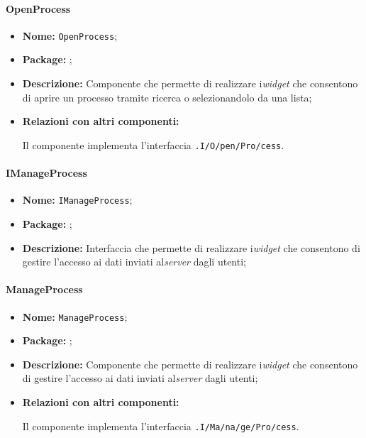 \paragraph{OpenProcess}
\begin{flushleft}
\begin{itemize}
\item \textbf{Nome:} \texttt{OpenProcess};
\item \textbf{Package:} \texttt{\viewAdmin{}};
\item \textbf{Descrizione:} Componente che permette di realizzare i\textit{widget} che consentono di aprire un processo tramite ricerca o selezionandolo da una lista;
\item \textbf{Relazioni con altri componenti:}
\begin{sloppypar}
Il componente implementa l'interfaccia \texttt{\viewAdmin{}.I\fshyp{}O\fshyp{}pen\fshyp{}Pro\fshyp{}cess}.
\end{sloppypar}
\end{itemize}
\end{flushleft}

\paragraph{IManageProcess}
\begin{itemize}
\item \textbf{Nome:} \texttt{IManageProcess};
\item \textbf{Package:} \texttt{\viewAdmin{}};
\item \textbf{Descrizione:} Interfaccia che permette di realizzare i\textit{widget} che consentono di gestire l'accesso ai dati inviati al\textit{server} dagli utenti;
\end{itemize}

\paragraph{ManageProcess}
\begin{flushleft}
\begin{itemize}
\item \textbf{Nome:} \texttt{ManageProcess};
\item \textbf{Package:} \texttt{\viewAdmin{}};
\item \textbf{Descrizione:} Componente che permette di realizzare i\textit{widget} che consentono di gestire l'accesso ai dati inviati al\textit{server} dagli utenti;
\item \textbf{Relazioni con altri componenti:}
\begin{sloppypar}
Il componente implementa l'interfaccia \texttt{\viewAdmin{}.I\fshyp{}Ma\fshyp{}na\fshyp{}ge\fshyp{}Pro\fshyp{}cess}.
\end{sloppypar}
\end{itemize}
\end{flushleft}

